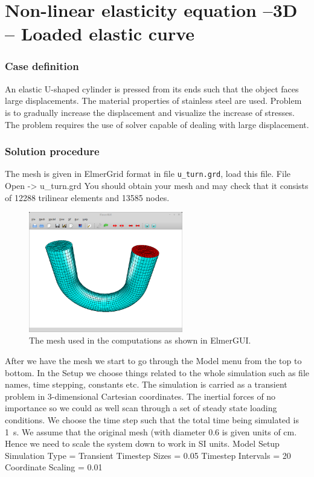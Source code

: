 \chapter{Non-linear elasticity equation --3D -- Loaded elastic curve}



\subsection*{Case definition}

An elastic U-shaped cylinder is pressed from its ends such that
the object faces large displacements. The material properties of
stainless steel are used. Problem is to gradually increase the displacement
and visualize the increase of stresses. The problem requires the use
of solver capable of dealing with large displacement.


\subsection*{Solution procedure}

The mesh is given in ElmerGrid format in file \texttt{u\_turn.grd},
load this file.
\ttbegin
File 
  Open -> u\_turn.grd
\ttend
You should obtain your mesh and may check that it consists of 12288 trilinear elements and 13585 nodes.
\begin{figure}[h!]
\begin{center}
  \includegraphics[width=0.6\textwidth]{UturnElmerGUI}
  \caption{The mesh used in the computations as shown in ElmerGUI.}
  \label{fig:UturnElmerGUI}
\end{center}
\end{figure}

After we have the mesh we start to go through the Model menu from the top to bottom. 
In the Setup we choose things related to the whole simulation such as file names, 
time stepping, constants etc.
The simulation is carried as a transient problem in 3-dimensional Cartesian
coordinates. The inertial forces of no importance so we could as well scan through a set of steady state
loading conditions. We choose the time step such that the total time being simulated is 1~s.
We assume that the original mesh (with diameter 0.6 is given units of cm. Hence we need to scale the
system down to work in SI units. 
\ttbegin
Model
  Setup 
    Simulation Type = Transient
    Timestep Sizes = 0.05
    Timestep Intervals = 20
    Coordinate Scaling = 0.01
\ttend

